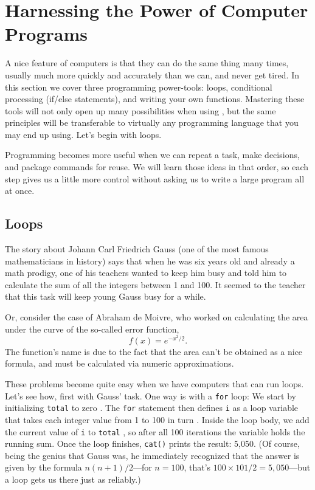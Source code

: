 \section{Harnessing the Power of Computer Programs}\label{sec:powertools}
A nice feature of computers is that they can do the same thing many times,
usually much more quickly and accurately than we can, and
never get tired. In this section we cover three programming power-tools: loops,
conditional processing (if/else statements), and writing your own functions.
Mastering these tools will not only open up many possibilities when using \R,
but the same principles will be transferable to virtually any programming language
that you may end up using. Let's begin with loops.

Programming becomes more useful when we can repeat a task, make decisions, and
package commands for reuse. We will learn those ideas in that order, so each
step gives us a little more control without asking us to write a large program
all at once.

\subsection{Loops}
The story about Johann Carl Friedrich Gauss (one of the most famous mathematicians
in history) says that when he was six years old and already a math prodigy, one
of his teachers wanted to keep him busy and told him to calculate the sum of
all the integers between 1 and 100. It seemed to the teacher that this task will keep
young Gauss busy for a while.

Or, consider the case of Abraham de Moivre, who worked on calculating the
area under the curve of the so-called error function, $$f(x)=e^{-x^2/2}.$$
The function's name is due to the fact that the area can't be obtained as a
nice formula, and must be calculated via numeric approximations.

These problems become quite easy when we have computers that can
run loops. Let's see how, first with Gauss' task.
 One way is with a \lstinline{for} loop:
We start by initializing \lstinline{total} to zero .
The \lstinline{for} statement then defines \lstinline{i} as a loop variable
that takes each integer value from 1 to 100 in turn .
Inside the loop body, we add the current value of \lstinline{i} to
\lstinline{total} , so after all 100 iterations the variable
holds the running sum. Once the loop finishes, \lstinline{cat()} prints
the result: 5,050. (Of course, being the genius that Gauss was, he immediately
recognized that the answer is given by the formula $n(n+1)/2$---for $n=100$,
that's $100 \times 101/2 = 5{,}050$---but a loop gets us there just as
reliably.)

